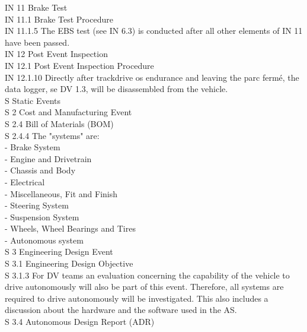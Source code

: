 \documentclass{article}
\begin{document}
IN 11 Brake Test\\

IN 11.1 Brake Test Procedure\\

IN 11.1.5 The EBS test (see IN 6.3) is conducted after all other elements of IN 11 have been passed.\\

IN 12 Post Event Inspection\\

IN 12.1 Post Event Inspection Procedure\\

IN 12.1.10 Directly after trackdrive os endurance and leaving the parc fermé, the data logger, se DV 1.3, will be disassembled from the vehicle.\\

S Static Events\\

S 2 Cost and Manufacturing Event\\

S 2.4 Bill of Materials (BOM)\\

S 2.4.4 The "systems" are:\\
	- Brake System\\
	- Engine and Drivetrain\\
	- Chassis and Body\\
	- Electrical\\
	- Miscellaneous, Fit and Finish\\
	- Steering System\\
	- Suspension System\\
	- Wheels, Wheel Bearings and Tires\\
	- Autonomous system\\
	
S 3 Engineering Design Event\\

S 3.1 Engineering Design Objective\\

S 3.1.3 For DV teams an evaluation concerning the capability of the vehicle to drive autonomously will also be part of this event. Therefore, all systems are required to drive autonomously will be investigated. This also includes a discussion about the hardware and the software used in the AS.\\

S 3.4 Autonomous Design Report (ADR)\\
\end{document}
